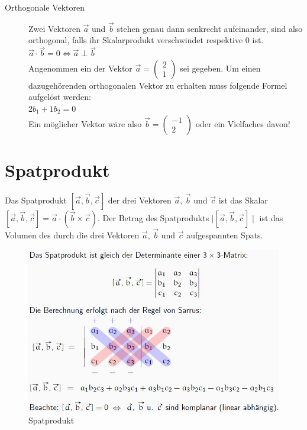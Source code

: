 \begin{description}
	\item[Orthogonale Vektoren]
	Zwei Vektoren $\vec{a}$ und $\vec{b}$ stehen genau dann senkrecht aufeinander, sind also orthogonal, falls ihr Skalarprodukt verschwindet respektive 0 ist.\\
	\begin{math}
		\vec{a} \cdot \vec{b} = 0 \iff \vec{a} \perp \vec{b}
	\end{math}
	\\Angenommen ein der Vektor $\vec{a} = \begin{pmatrix} 2 \\ 1 \end{pmatrix}$ sei gegeben. Um einen dazugehörenden orthogonalen Vektor zu erhalten muss folgende Formel aufgelöst werden:\\
	\begin{math}
		2b_{1} + 1b_2 = 0
	\end{math}
	\\Ein möglicher Vektor wäre also $\vec{b} = \begin{pmatrix} -1 \\ 2 \end{pmatrix}$ oder ein Vielfaches davon!
\end{description}
\section{Spatprodukt}

Das Spatprodukt $[\vec{a}, \vec{b}, \vec{c}]$ der drei Vektoren $\vec{a}$, $\vec{b}$ und $\vec{c}$ ist das Skalar $[\vec{a}, \vec{b}, \vec{c}] = \vec{a} \cdot (\vec{b} \times \vec{c})$.
Der Betrag des Spatprodukts $\mid [\vec{a}, \vec{b}, \vec{c}] \mid$ ist das Volumen des durch die drei Vektoren $\vec{a}$, $\vec{b}$ und $\vec{c}$ aufgespannten Spats.

\begin{figure}[!ht]
	\centering
	\includegraphics[width=0.7\linewidth]{fig/spatprodukt}
	\caption{Spatprodukt}
	\label{fig:spatprodukt}
\end{figure}

